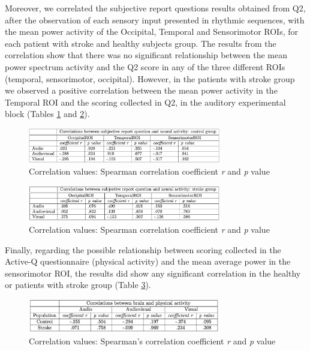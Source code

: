 Moreover, we correlated the subjective report questions results obtained from Q2, after the observation of each sensory input presented in rhythmic sequences, with the mean power activity of the Occipital, Temporal and Sensorimotor ROIs, for each patient with stroke and healthy subjects group.
The results from the correlation show that there was no significant relationship between the mean power spectrum activity and the Q2 score in any of the three different ROIs (temporal, sensorimotor, occipital). However, in the patients with stroke group we observed a positive correlation between the mean power activity in the Temporal ROI and the scoring collected in Q2, in the auditory experimental block (Tables \ref{fig: correlation values q2: control} and \ref{fig correlation values q2: stroke}).
\begin{figure}[H]
    \centering
    \includegraphics[width=0.75\textwidth]{scatter_plots/correlation_q2_control.png}
    \caption{Correlation values: Spearman correlation coefficient \textit{r} and \textit{p} value}
    \label{fig: correlation values q2: control} 
\end{figure}

\begin{figure}[H]
    \centering
    \includegraphics[width=0.75\textwidth]{scatter_plots/correlation_q2_stroke.png}
    \caption{Correlation values: Spearman correlation coefficient \textit{r} and \textit{p} value}
    \label{fig correlation values q2: stroke} 
\end{figure}

Finally, regarding the possible relationship between scoring collected in the Active-Q questionnaire (physical activity) and the mean average power in the sensorimotor ROI, the results did show any significant correlation in the healthy or patients with stroke group (Table \ref{fig: significance correlation activeq}). 
\begin{figure}[H]
    \centering
    \includegraphics[width=0.75\textwidth]{significance_tables/correlation_activeq_.png}
    \caption{Correlation values: Spearman's correlation coefficient \textit{r} and \textit{p} value}
    \label{fig: significance correlation activeq} 
\end{figure}

